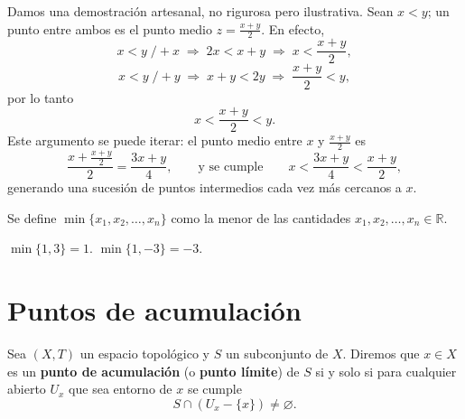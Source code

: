 Damos una demostración artesanal, no rigurosa pero ilustrativa. Sean $x<y$;
un punto entre ambos es el punto medio $z = \tfrac{x+y}{2}$. En efecto,
\[
x<y \;\big/+x \;\Rightarrow\; 2x<x+y \;\Rightarrow\; x<\frac{x+y}{2},
\]
\[
x<y \;\big/+y \;\Rightarrow\; x+y<2y \;\Rightarrow\; \frac{x+y}{2}<y,
\]
por lo tanto
\[
x < \frac{x+y}{2} < y .
\]
Este argumento se puede iterar: el punto medio entre $x$ y $\tfrac{x+y}{2}$
es
\[
\frac{x+\tfrac{x+y}{2}}{2} = \frac{3x+y}{4}, \qquad\text{y se cumple}\qquad
x < \frac{3x+y}{4} < \frac{x+y}{2},
\]
generando una sucesión de puntos intermedios cada vez más cercanos a $x$.

\begin{definicion}
Se define $\min\{x_1,x_2,\dots,x_n\}$ como la menor de las cantidades
$x_1,x_2,\dots,x_n \in \mathbb{R}$.
\end{definicion}

\begin{ejemplo}
$\min\{1,3\} = 1$. \qquad $\min\{1,-3\} = -3$.
\end{ejemplo}

\section{Puntos de acumulación}

\begin{definicion}
Sea $(X,T)$ un espacio topológico y $S$ un subconjunto de $X$. Diremos que
$x\in X$ es un \textbf{punto de acumulación} (o \textbf{punto límite}) de
$S$ si y solo si para cualquier abierto $U_x$ que sea entorno de $x$ se
cumple
\[
S \cap (U_x - \{x\}) \neq \varnothing .
\]
\end{definicion}

